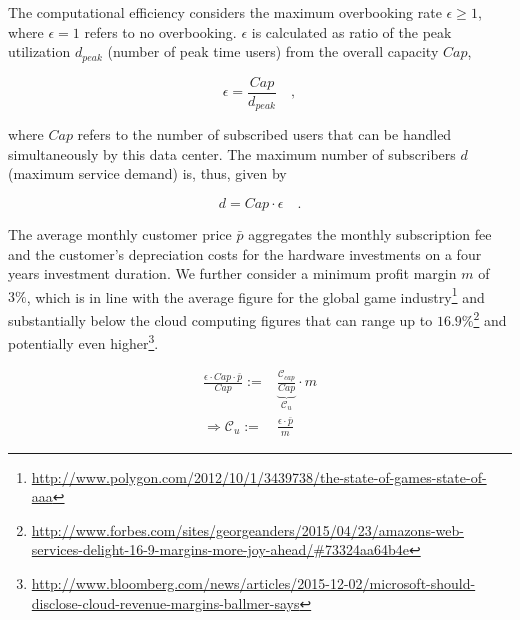 The computational efficiency considers the maximum overbooking rate $\epsilon \geq 1$, where $\epsilon = 1$ refers to no overbooking. $\epsilon$ is calculated as ratio of the peak utilization $d_{peak}$ (number of peak time users) from the overall capacity $Cap$, 

\begin{equation}
	\epsilon = \frac{Cap}{d_{peak}} \quad ,
\end{equation}

where $Cap$ refers to the number of subscribed users that can be handled simultaneously by this data center. The maximum number of subscribers $d$ (maximum service demand) is, thus, given by

\begin{equation}
	 d = Cap \cdot \epsilon \quad .
\end{equation}

The average monthly customer price $\bar{p}$ aggregates the monthly subscription fee and the customer's depreciation costs for the hardware investments on a four years investment duration. We further consider a minimum profit margin $m$ of $3 \%$, which is in line with the average figure for the global game industry\footnote{\url{http://www.polygon.com/2012/10/1/3439738/the-state-of-games-state-of-aaa}} and substantially below the cloud computing figures that can range up to $16.9\%$\footnote{\url{http://www.forbes.com/sites/georgeanders/2015/04/23/amazons-web-services-delight-16-9-margins-more-joy-ahead/\#73324aa64b4e}} and potentially even higher\footnote{\url{http://www.bloomberg.com/news/articles/2015-12-02/microsoft-should-disclose-cloud-revenue-margins-ballmer-says}}.


\begin{align} \label{eq:computational_efficiency}
	\frac{\epsilon \cdot Cap \cdot \bar{p}}{Cap} :=& \underbrace{\frac{\mathcal{C}_{cap}}{Cap}}_{\mathcal{C}_{u}} \cdot m\\
	\Longrightarrow \mathcal{C}_{u} :=& \frac{\epsilon \cdot \bar{p}}{m}
\end{align}


